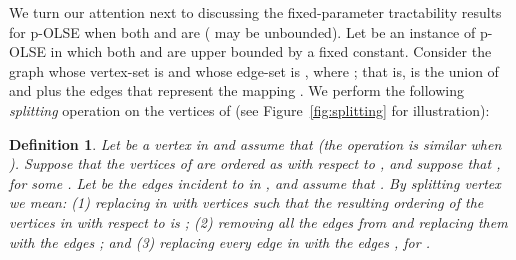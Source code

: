\documentclass[11pt]{article}
\newtheorem{definition}[theorem]{Definition}
\begin{document}
We turn our attention next to discussing the fixed-parameter tractability results for p-OLSE when both  and  are  ( may be unbounded). Let  be an instance of p-OLSE in which both  and  are upper bounded by a fixed constant. Consider the graph  whose vertex-set is  and whose edge-set is , where ; that is,  is the union of  and  plus the edges that represent the mapping . We perform the following {\em splitting} operation on the vertices of  (see Figure~\ref{fig:splitting} for illustration):

\begin{definition}\label{def:splitting}
Let  be a vertex in  and assume that  (the operation is similar when ). Suppose that the vertices of  are ordered as  with respect to , and suppose that , for some . Let  be the edges incident to  in , and assume that . By {\em splitting} vertex  we mean: (1) replacing  in  with vertices  such that the resulting ordering of the vertices in  with respect to  is ; (2) removing all the edges  from  and replacing them with the edges ; and (3) replacing every edge  in  with the edges , for .
\end{definition}
\end{document}
